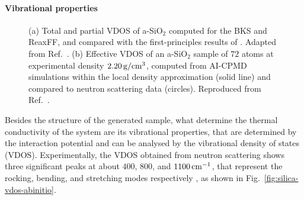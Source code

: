 \paragraph{Vibrational properties}
\begin{figure}[!tb]
    \centering
    \caption{
    (a) Total and partial VDOS of a-SiO$_2$ computed for the BKS and ReaxFF, and compared with the first-principles results of \citet{Bhattarai2016}. Adapted from Ref.~\cite{Tian2017}.
    (b) Effective VDOS of an a-SiO$_2$ sample of $72$ atoms at experimental density $2.20\,\mathrm{g/cm^3}$, computed from AI-CPMD simulations within the local density approximation (solid line) and compared to neutron scattering data (circles). Reproduced from Ref.~\cite{Sarnthein1997}.}
\end{figure}

Besides the structure of the generated sample, what determine the thermal conductivity of the system are its vibrational properties, that are determined by the interaction potential and can be analysed by the vibrational density of states (VDOS).
Experimentally, the VDOS obtained from neutron scattering shows three significant peaks at about $400$, $800$, and $1100\,\mathrm{cm^{-1}}$, that represent the rocking, bending, and stretching modes respectively \cite{Galeener1983}, as shown in Fig.~\ref{fig:silica-vdos-abinitio}.

